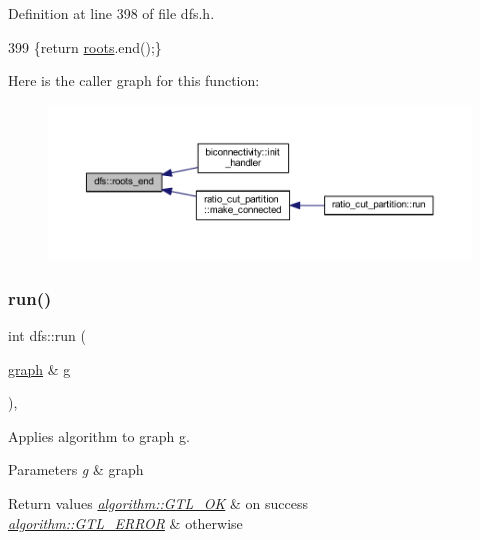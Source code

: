 Definition at line 398 of file dfs.\+h.


\begin{DoxyCode}
399     \{\textcolor{keywordflow}{return} \mbox{\hyperlink{classdfs_a0bbd5cb8df26c891b74dadd84b46a06b}{roots}}.end();\}
\end{DoxyCode}
Here is the caller graph for this function\+:
\nopagebreak
\begin{figure}[H]
\begin{center}
\leavevmode
\includegraphics[width=350pt]{classdfs_ae1a61d8c2d8d99059cab410f766ec73f_icgraph}
\end{center}
\end{figure}
\mbox{\label{classdfs_af0863b8974d5fd58cd0375c78ed8163b}} 
\subsubsection{\texorpdfstring{run()}{run()}}
{\footnotesize\ttfamily int dfs\+::run (\begin{DoxyParamCaption}\item[{\mbox{\hyperlink{classgraph}{graph}} \&}]{g }\end{DoxyParamCaption})\hspace{0.3cm}{\ttfamily [virtual]}, {\ttfamily [inherited]}}



Applies algorithm to graph g. 


\begin{DoxyParams}{Parameters}
{\em g} & graph \\
\hline
\end{DoxyParams}

\begin{DoxyRetVals}{Return values}
{\em \mbox{\hyperlink{classalgorithm_af1a0078e153aa99c24f9bdf0d97f6710a5114c20e4a96a76b5de9f28bf15e282b}{algorithm\+::\+G\+T\+L\+\_\+\+OK}}} & on success \\
\hline
{\em \mbox{\hyperlink{classalgorithm_af1a0078e153aa99c24f9bdf0d97f6710a6fcf574690bbd6cf710837a169510dd7}{algorithm\+::\+G\+T\+L\+\_\+\+E\+R\+R\+OR}}} & otherwise \\
\hline
\end{DoxyRetVals}


